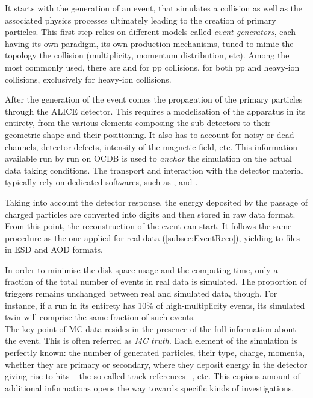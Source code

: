It starts with the generation of an event, that simulates a collision as well as the associated physics processes ultimately leading to the creation of primary particles. This first step relies on different models called \textit{event generators}, each having its own paradigm, its own production mechanisms, tuned to mimic the topology the collision (multiplicity, momentum distribution, etc). Among the most commonly used, there are \Pythia \cite{bierlichComprehensiveGuidePhysics2022} and \Herwig \cite{bahrHerwigPhysicsManual2008} for pp collisions, \Epos \cite{pierogEPOSLHCTest2015} for both pp and heavy-ion collisions, \Hijing \cite{wangHIJINGMonteCarlo1994} exclusively for heavy-ion collisions.

After the generation of the event comes the propagation of the primary particles through the ALICE detector. This requires a modelisation of the apparatus in its entirety, from the various elements composing the sub-detectors to their geometric shape and their positioning. It also has to account for noisy or dead channels, detector defects, intensity of the magnetic field, etc. This information available run by run on OCDB is used to \textit{anchor} the simulation on the actual data taking conditions. The transport and interaction with the detector material typically rely on dedicated softwares, such as \GeantThree \cite{brunGEANTUserGuide1987}, \GeantFour \cite{geant4Geant4HomePage2022} and \Fluka \cite{battistoniOverviewFLUKACode2015}.

Taking into account the detector response, the energy deposited by the passage of charged particles are converted into digits and then stored in raw data format. From this point, the reconstruction of the event can start. It follows the same procedure as the one applied for real data (\Sec\ref{subsec:EventReco}), yielding to files in ESD and AOD formats.

In order to minimise the disk space usage and the computing time, only a fraction of the total number of events in real data is simulated. The proportion of triggers remains unchanged between real and simulated data, though. For instance, if a run in its entirety has 10\% of high-multiplicity events, its simulated twin will comprise the same fraction of such events.\\

The key point of MC data resides in the presence of the full information about the event. This is often referred as \textit{MC truth}. Each element of the simulation is perfectly known: the number of generated particles, their type, charge, momenta, whether they are primary or secondary, where they deposit energy in the detector giving rise to hits -- the so-called track references --, etc. This copious amount of additional informations opens the way towards specific kinds of investigations. 

